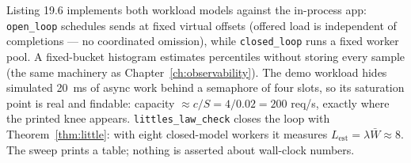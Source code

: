 Listing 19.6 implements both workload models against the
in-process app: \texttt{open\_loop} schedules sends at fixed virtual
offsets (offered load is independent of completions --- no coordinated
omission), while \texttt{closed\_loop} runs a fixed worker pool. A
fixed-bucket histogram estimates percentiles without storing every sample
(the same machinery as Chapter~\ref{ch:observability}). The demo workload
hides simulated 20~ms of async work behind a semaphore of four slots, so
its saturation point is real and findable: capacity $\approx c/S =
4/0.02 = 200$ req/s, exactly where the printed knee appears.
\texttt{littles\_law\_check} closes the loop with
Theorem~\ref{thm:little}: with eight closed-model workers it measures
$L_{\text{est}} = \lambda \bar{W} \approx 8$. The sweep prints a table;
nothing is asserted about wall-clock numbers.

